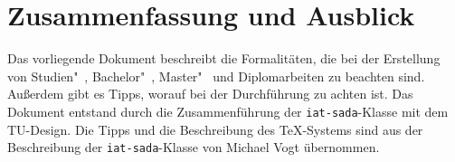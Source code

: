 %
\chapter{Zusammenfassung und Ausblick}
%
Das vorliegende Dokument beschreibt die Formalitäten, die bei der Erstellung von Studien"~, Bachelor"~, Master"~ und Diplomarbeiten zu beachten sind. Außerdem gibt es Tipps, worauf bei der Durchführung zu achten ist. Das Dokument entstand durch die Zusammenführung der \verb|iat-sada|-Klasse mit dem TU-Design. Die Tipps und die Beschreibung des \TeX-Systems sind aus der Beschreibung der \verb|iat-sada|-Klasse von Michael Vogt übernommen.


